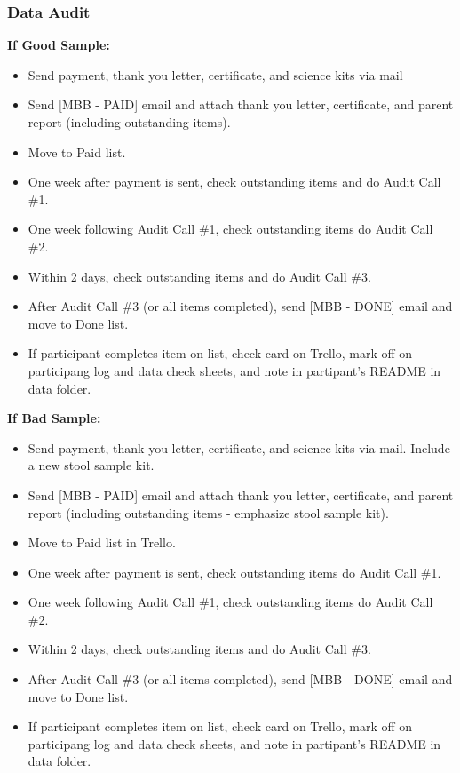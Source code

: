 \documentclass[]{book}
\begin{document}
\hypertarget{data-audit-1}{%
\subsubsection{Data Audit}\label{data-audit-1}}

\textbf{If Good Sample:}

\begin{itemize}
\item
  Send payment, thank you letter, certificate, and science kits via mail
\item
  Send {[}MBB - PAID{]} email and attach thank you letter, certificate, and parent report (including outstanding items).
\item
  Move to Paid list.
\item
  One week after payment is sent, check outstanding items and do Audit Call \#1.
\item
  One week following Audit Call \#1, check outstanding items do Audit Call \#2.
\item
  Within 2 days, check outstanding items and do Audit Call \#3.
\item
  After Audit Call \#3 (or all items completed), send {[}MBB - DONE{]} email and move to Done list.
\item
  If participant completes item on list, check card on Trello, mark off on participang log and data check sheets, and note in partipant's README in data folder.
\end{itemize}

\textbf{If Bad Sample:}

\begin{itemize}
\item
  Send payment, thank you letter, certificate, and science kits via mail. Include a new stool sample kit.
\item
  Send {[}MBB - PAID{]} email and attach thank you letter, certificate, and parent report (including outstanding items - emphasize stool sample kit).
\item
  Move to Paid list in Trello.
\item
  One week after payment is sent, check outstanding items do Audit Call \#1.
\item
  One week following Audit Call \#1, check outstanding items do Audit Call \#2.
\item
  Within 2 days, check outstanding items and do Audit Call \#3.
\item
  After Audit Call \#3 (or all items completed), send {[}MBB - DONE{]} email and move to Done list.
\item
  If participant completes item on list, check card on Trello, mark off on participang log and data check sheets, and note in partipant's README in data folder.
\end{itemize}
\end{document}
